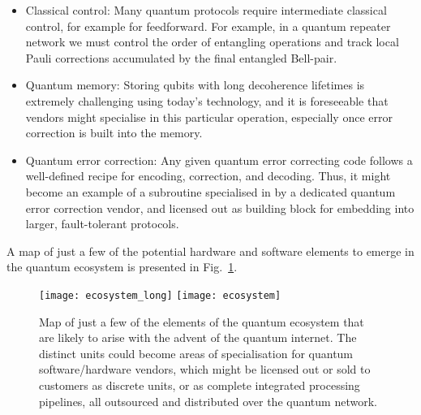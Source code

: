 \begin{itemize}
\item Classical control: Many quantum protocols require intermediate classical control, for example for feedforward. For example, in a quantum repeater network we must control the order of entangling operations and track local Pauli corrections accumulated by the final entangled Bell-pair.

\item Quantum memory: Storing qubits with long decoherence lifetimes is extremely challenging using today's technology, and it is foreseeable that vendors might specialise in this particular operation, especially once error correction is built into the memory. 

\item Quantum error correction: Any given quantum error correcting code follows a well-defined recipe for encoding, correction, and decoding. Thus, it might become an example of a subroutine specialised in by a dedicated quantum error correction vendor, and licensed out as building block for embedding into larger, fault-tolerant protocols.
\end{itemize}

A map of just a few of the potential hardware and software elements to emerge in the quantum ecosystem is presented in Fig.~\ref{fig:ecosystem}.

\begin{figure}[!htpb]
\pubmode
\texttt{[image: ecosystem\_long]}
\else
\texttt{[image: ecosystem]}
\fi
\caption{Map of just a few of the elements of the quantum ecosystem that are likely to arise with the advent of the quantum internet. The distinct units could become areas of specialisation for quantum software/hardware vendors, which might be licensed out or sold to customers as discrete units, or as complete integrated processing pipelines, all outsourced and distributed over the quantum network.}\label{fig:ecosystem}	
\end{figure}